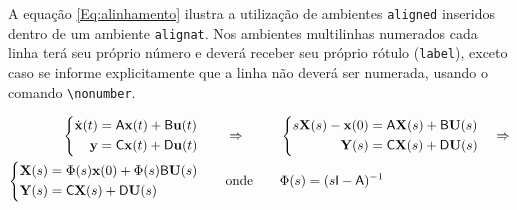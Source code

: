 A equação \ref{Eq:alinhamento} ilustra a utilização de ambientes
\texttt{aligned} inseridos dentro de um ambiente \texttt{alignat}.
Nos ambientes multilinhas numerados cada linha terá seu próprio número
e deverá receber seu próprio rótulo (\texttt{label}), exceto caso se
informe explicitamente que a linha não deverá ser numerada, usando o
comando \verb|\nonumber|.

\begin{alignat}{3}
\left\{\begin{aligned} %
\dot{\mathbf{x}}(t) &= \mathsf{A}\mathbf{x}(t)+\mathsf{B}\mathbf{u}(t) \\
\mathbf{y} &= \mathsf{C}\mathbf{x}(t)+\mathsf{D}\mathbf{u}(t)
\end{aligned}\right.&
&
&\implica
&
&\left\{\begin{aligned} %
s\mathbf{X}(s)-\mathbf{x}(0)&=\mathsf{A}\mathbf{X}(s)+\mathsf{B}\mathbf{U}(s)\\
\mathbf{Y}(s) &= \mathsf{C}\mathbf{X}(s)+\mathsf{D}\mathbf{U}(s)
\end{aligned}\right.\implicafim
\nonumber
\\
\left\{\begin{aligned} %
\mathbf{X}(s) &= \Phi(s)\mathbf{x}(0) + \Phi(s)\mathsf{B}\mathbf{U}(s) \\
\mathbf{Y}(s) &= \mathsf{C}\mathbf{X}(s)+\mathsf{D}\mathbf{U}(s)
\end{aligned}\right.&
&
&\quad \text{onde} \quad
&
&\Phi(s) = (s\mathsf{I}-\mathsf{A})^{-1}
\label{Eq:alinhamento}
\end{alignat}
